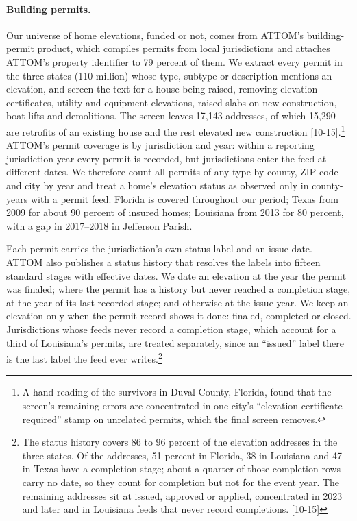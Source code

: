 \paragraph{Building permits.}
Our universe of home elevations, funded or not, comes from ATTOM's building-permit product,
which compiles permits from local jurisdictions and attaches ATTOM's property identifier to
79 percent of them. We extract every permit in the three states (110 million) whose type,
subtype or description mentions an elevation, and screen the text for a house being raised,
removing elevation certificates, utility and equipment elevations, raised slabs on new
construction, boat lifts and demolitions. The screen leaves 17,143 addresses, of which 15,290
are retrofits of an existing house and the rest elevated new construction [10-15].\footnote{A
hand reading of the survivors in Duval County, Florida, found that the screen's remaining
errors are concentrated in one city's ``elevation certificate required'' stamp on unrelated
permits, which the final screen removes.} ATTOM's permit coverage is by jurisdiction and year:
within a reporting jurisdiction-year every permit is recorded, but jurisdictions enter the feed
at different dates. We therefore count all permits of any type by county, ZIP code and city by
year and treat a home's elevation status as observed only in county-years with a permit feed.
Florida is covered throughout our period; Texas from 2009 for about 90 percent of insured
homes; Louisiana from 2013 for 80 percent, with a gap in 2017--2018 in Jefferson Parish.

Each permit carries the jurisdiction's own status label and an issue date. ATTOM also
publishes a status history that resolves the labels into fifteen standard stages with effective
dates. We date an elevation at the year the permit was finaled; where the permit has a history
but never reached a completion stage, at the year of its last recorded stage; and otherwise at
the issue year. We keep an elevation only when the permit record shows it done: finaled,
completed or closed. Jurisdictions whose feeds never record a completion stage, which account
for a third of Louisiana's permits, are treated separately, since an ``issued'' label there is
the last label the feed ever writes.\footnote{The status history covers 86 to 96 percent of the elevation addresses in the three
states. Of the addresses, 51 percent in Florida, 38 in Louisiana and 47 in Texas have a completion
stage; about a quarter of those completion rows carry no date, so they count for completion but
not for the event year. The remaining addresses sit at issued, approved or applied, concentrated
in 2023 and later and in Louisiana feeds that never record completions. [10-15]}

